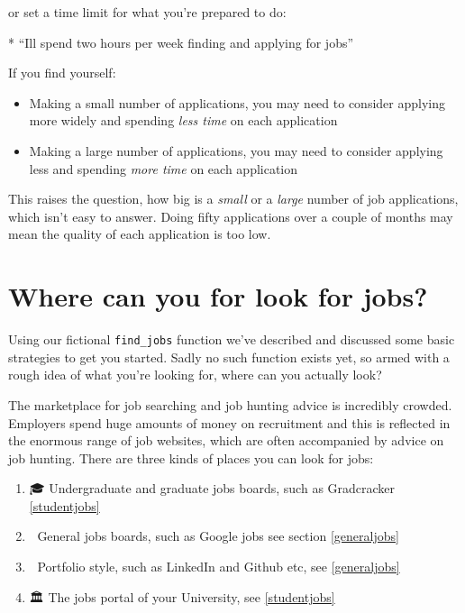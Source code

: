 \documentclass[
]{book}
\newenvironment{Shaded}{\begin{snugshade}}{\end{snugshade}}
\newcommand{\NormalTok}[1]{#1}
\newcommand{\SpecialStringTok}[1]{\textcolor[rgb]{0.31,0.60,0.02}{#1}}
\providecommand{\tightlist}{%
  \setlength{\itemsep}{0pt}\setlength{\parskip}{0pt}}
\begin{document}
or set a time limit for what you're prepared to do:

\begin{Shaded}
\begin{Highlighting}[]
\SpecialStringTok{* }\NormalTok{“I\textquotesingle{}ll spend two hours per week finding and applying for jobs”}
\end{Highlighting}
\end{Shaded}

If you find yourself:

\begin{itemize}
\tightlist
\item
  Making a small number of applications, you may need to consider applying more widely and spending \emph{less time} on each application
\item
  Making a large number of applications, you may need to consider applying less and spending \emph{more time} on each application
\end{itemize}

This raises the question, how big is a \emph{small} or a \emph{large} number of job applications, which isn't easy to answer. Doing fifty applications over a couple of months may mean the quality of each application is too low.

\hypertarget{looking}{%
\section{Where can you for look for jobs?}\label{looking}}

Using our fictional \texttt{find\_jobs} function we've described and discussed some basic strategies to get you started. Sadly no such function exists yet, so armed with a rough idea of what you're looking for, where can you actually look?

The marketplace for job searching and job hunting advice is incredibly crowded. Employers spend huge amounts of money on recruitment and this is reflected in the enormous range of job websites, which are often accompanied by advice on job hunting. There are three kinds of places you can look for jobs:

\begin{enumerate}
\def\labelenumi{\arabic{enumi}.}
\tightlist
\item
  🎓 Undergraduate and graduate jobs boards, such as Gradcracker \ref{studentjobs}
\item
  👀 General jobs boards, such as Google jobs see section \ref{generaljobs}
\item
  🎨 Portfolio style, such as LinkedIn and Github etc, see \ref{generaljobs}
\item
  🏛️ The jobs portal of your University, see \ref{studentjobs}
\end{enumerate}
\end{document}
